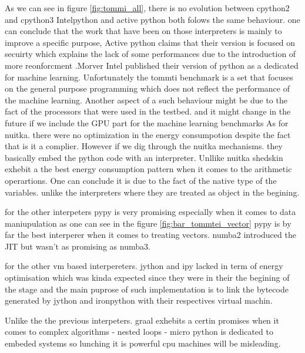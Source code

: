 


As we can see in figure \ref{fig:tommi_all}, there is no evolution between cpython2 and cpython3
Intelpython and active python both folows the same behaviour. one can conclude that the work that have been on those interpreters is mainly
to improve a specific purpose, Active python claims that their version is focused on secuirty which explains the lack of some performances due to the introduction of more reonforcment
.Morver Intel published their version of python as a dedicated for machine learning. Unfortunately the tommti benchmark is a set that focuses on the general purpose programming
which does not reflect the performance of the machine learning.
Another aspect of a such behaviour might be due to the fact of the processors that were used in the testbed. and it might change in the future if we include the GPU part for the machine learning benchmarks
As for nuitka. there were no optimization in the energy consumpotion despite the fact that is it a complier.
However if we dig through the nuitka mechanisms. they basically embed the python code with an interpreter.
Unllike nuitka shedskin exhebit a the best energy consumption pattern when it comes to the arithmetic operartions. One can conclude it is due to the fact of the native type of the variables. unlike the interpreters where they are treated as object in the begining.

for the other interpeters pypy is very promising especially when it comes to data maniupulation as one can see in the figure \ref{fig:bar_tommtei_vector}
pypy is by far the best interperer when it comes to treating vectors.
numba2 introduced the JIT but wasn't as promising as numba3.

for the other vm based interpereters. jython and ipy lacked in term of energy optimisation which was kinda expected since they were in their the begining of the stage and the main puprose of such implementation is to link the bytecode generated by jython and ironpython with their respectives virtual machin.

Unlike the the previous interpeters. graal exhebits a certin promises when it comes to complex algorithms - nested loops -
micro python is dedicated to embeded systems so lunching it is powerful cpu machines will be misleading.

